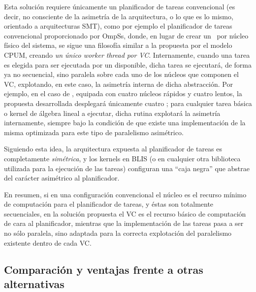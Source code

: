 Esta solución requiere únicamente un planificador de tareas convencional (es decir, no consciente de la asimetría de la arquitectura, o lo
que es lo mismo, orientado a arquitecturas SMT), como por ejemplo el planificador de tareas convencional proporcionado por OmpSs, donde, 
en lugar de crear un \wt\ por núcleo físico del sistema, se sigue una filosofía similar a la propuesta por el modelo CPUM, creando 
{\em un único worker thread por VC}. Internamente, cuando una tarea es elegida para ser ejecutada por un \wt disponible, dicha tarea
se ejecutará, de forma ya no secuencial, sino paralela sobre cada uno de los núcleos que componen el VC, explotando, en este caso,
la asimetría interna de dicha abstracción. Por ejemplo, en el caso de \odroid, equipada con cuatro núcleos rápidos y cuatro lentos, 
la propuesta desarrollada desplegará únicamente cuatro \wts; para cualquier tarea básica o kernel de álgebra lineal a ejecutar, dicha
rutina explotará la asimetría internamente, siempre bajo la condición de que existe una implementación de la misma optimizada para
este tipo de paralelismo asimétrico.

Siguiendo esta idea, la arquitectura expuesta al planificador de tareas es completamente {\em simétrica}, y los kernels en BLIS
(o en cualquier otra biblioteca utilizada para la ejecución de las tareas) configuran una ``caja negra'' que abstrae del carácter
asimétrico al planificador.

En resumen, si en una configuración convencional el núcleo es el recurso mínimo de computación para el planificador de tareas,
y éstas son totalmente secuenciales, en la solución propuesta el VC es el recurso básico de computación de cara al planificador,
mientras que la implementación de las tareas pasa a ser no sólo paralela, sino adaptada para la correcta explotación del paralelismo
existente dentro de cada VC.

\subsection{Comparación y ventajas frente a otras alternativas}



